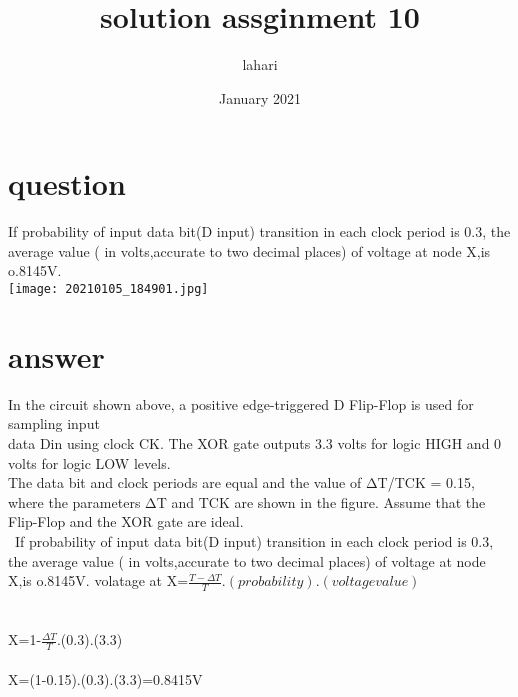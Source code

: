 \documentclass{article}
\title{solution assginment 10}
\author{lahari}
\date{January 2021}
\begin{document}
\maketitle

\section{question}

If probability of input data bit(D input) transition in each clock period is 0.3, the average value ( in volts,accurate to two decimal places)
of voltage at node X,is o.8145V.\\
\texttt{[image: 20210105\_184901.jpg]}

\section{answer}


 In the circuit shown above, a positive edge-triggered D Flip-Flop is used for sampling input\\
data Din using clock CK. The XOR gate outputs 3.3 volts for logic HIGH and 0 volts for
logic LOW levels.\\
The data bit and clock periods are equal and the value of ΔT/TCK = 0.15,\\
where the parameters ΔT and TCK are shown in the figure. Assume that the Flip-Flop and the
XOR gate are ideal.\\\
If probability of input data bit(D input) transition in each clock period is 0.3, the average value ( in volts,accurate to two decimal places)
of voltage at node X,is o.8145V.
    volatage at X=$\frac{T-\Delta T}{T}.(probability).(voltage value)$\\\\\\
    X=1-$\frac{\Delta T}{T}$.(0.3).(3.3)\\\\
    X=(1-0.15).(0.3).(3.3)=0.8415V
\
\end{document}
